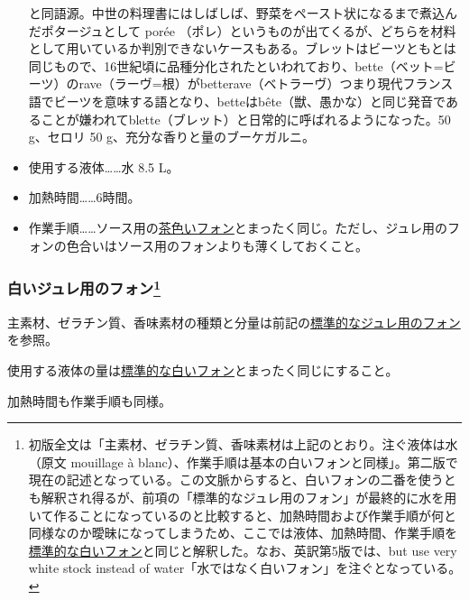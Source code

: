 \begin{recette}
\begin{itemize}
{    と同語源。中世の料理書にはしばしば、野菜をペースト状になるまで煮込んだポタージュとして
    porée
    （ポレ）というものが出てくるが、どちらを材料として用いているか判別できないケースもある。ブレットはビーツともとは同じもので、16世紀頃に品種分化されたといわれており、bette（ベット=ビーツ）のrave（ラーヴ=根）がbetterave（ベトラーヴ）つまり現代フランス語でビーツを意味する語となり、betteはbête（獣、愚かな）と同じ発音であることが嫌われてblette（ブレット）と日常的に呼ばれるようになった。}50
  g、セロリ 50 g、充分な香りと量のブーケガルニ。
\item
  使用する液体\ldots{}\ldots{}水 8.5 L。
\item
  加熱時間\ldots{}\ldots{}6時間。
\item
  作業手順\ldots{}\ldots{}ソース用の\protect\hyperlink{fonds-brun}{茶色いフォン}とまったく同じ。ただし、ジュレ用のフォンの色合いはソース用のフォンよりも薄くしておくこと。
\end{itemize}

\hypertarget{fonds-pour-gelee-blanche}{%
\subsubsection[白いジュレ用のフォン]{\texorpdfstring{白いジュレ用のフォン\footnote{初版全文は「主素材、ゼラチン質、香味素材は上記のとおり。注ぐ液体は水（原文
  mouillage à
  blanc）、作業手順は基本の白いフォンと同様」。第二版で現在の記述となっている。この文脈からすると、白いフォンの二番を使うとも解釈され得るが、前項の「標準的なジュレ用のフォン」が最終的に水を用いて作ることになっているのと比較すると、加熱時間および作業手順が何と同様なのか曖昧になってしまうため、ここでは液体、加熱時間、作業手順を\protect\hyperlink{fonds-blanc}{標準的な白いフォン}と同じと解釈した。なお、英訳第5版では、but
  use very white stock instead of
  water「水ではなく白いフォン」を注ぐとなっている。}}{白いジュレ用のフォン}}\label{fonds-pour-gelee-blanche}}



主素材、ゼラチン質、香味素材の種類と分量は前記の\protect\hyperlink{fonds-pour-gelee-ordinaire}{標準的なジュレ用のフォン}を参照。

使用する液体の量は\protect\hyperlink{fonds-blanc}{標準的な白いフォン}とまったく同じにすること。

加熱時間も作業手順も同様。


\end{recette}
